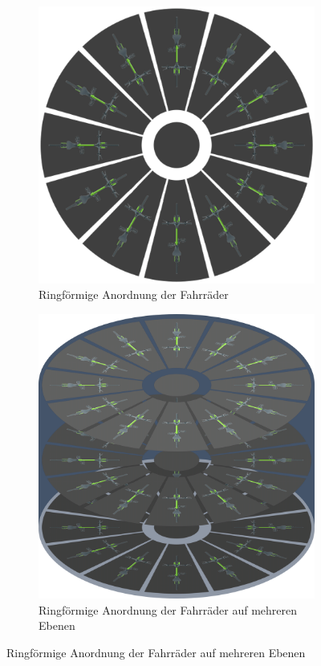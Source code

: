 \begin{figure}[H]
  \centering
  \begin{subfigure}{0.39\textwidth}
    \centering
    \includegraphics[width=\textwidth]{images/rondell_skizze_oben.png}
    \caption{Ringförmige Anordnung der Fahrräder}
    \label{fig:rondell_skizze_oben}
  \end{subfigure}
  \begin{subfigure}{0.39\textwidth}
    \centering
    \includegraphics[width=\textwidth]{images/rondell_skizze_seite.png}
    \caption{Ringförmige Anordnung der Fahrräder auf mehreren Ebenen}
    \label{fig:rondell_skizze_seite}
  \end{subfigure}
\end{figure}

